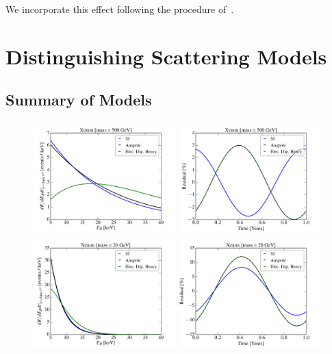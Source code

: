 \documentclass[11pt]{article}
\begin{document}
We incorporate this effect following the procedure of~\cite{Lee:2013wza}. 


\section{Distinguishing Scattering Models}\label{sec:procedure}

\subsection{Summary of Models}


\begin{figure}
\centering
\includegraphics[width=0.49\textwidth, trim=0.cm 0.0cm 0.cm 0.0cm,clip=true]{plots/RecoilComparison_500GeV.pdf}
\includegraphics[width=0.49\textwidth, trim=0.cm 0.0cm 0.cm 0.0cm,clip=true]{plots/Xenon_SIvsAnapole_500GeV_Residual_Theory.pdf}
\includegraphics[width=0.49\textwidth, trim=0.cm 0.0cm 0.cm 0.0cm,clip=true]{plots/RecoilComparison_20GeV.pdf}
\includegraphics[width=0.49\textwidth, trim=0.cm 0.0cm 0.cm 0.0cm,clip=true]{plots/Xenon_SIvsAnapole_20GeV_Residual_Theory.pdf}

\end{figure}
\end{document}
